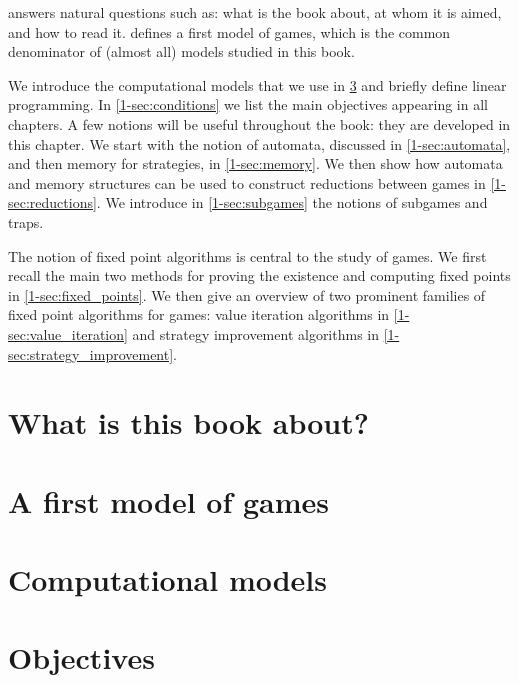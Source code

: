 

 answers natural questions such as: what is the book about, at whom it is aimed, and how to read it.
 defines a first model of games, which is the common denominator of (almost all) models studied in this book.

We introduce the computational models that we use in \cref{1-sec:computation} and briefly define linear programming.
In \cref{1-sec:conditions} we list the main objectives appearing in all chapters.
A few notions will be useful throughout the book: they are developed in this chapter.
We start with the notion of automata, discussed in \cref{1-sec:automata}, and then memory for strategies, in \cref{1-sec:memory}.
We then show how automata and memory structures can be used to construct reductions between games in \cref{1-sec:reductions}.
We introduce in \cref{1-sec:subgames} the notions of subgames and traps.

The notion of fixed point algorithms is central to the study of games.
We first recall the main two methods for proving the existence and computing fixed points in \cref{1-sec:fixed_points}.
We then give an overview of two prominent families of fixed point algorithms for games:
value iteration algorithms in \cref{1-sec:value_iteration} and strategy improvement algorithms in \cref{1-sec:strategy_improvement}.

\section{What is this book about?}
\label{1-sec:intro}



\section{A first model of games}
\label{1-sec:simple}



\section{Computational models}
\label{1-sec:computation}



\section{Objectives}
\label{1-sec:objectives}


